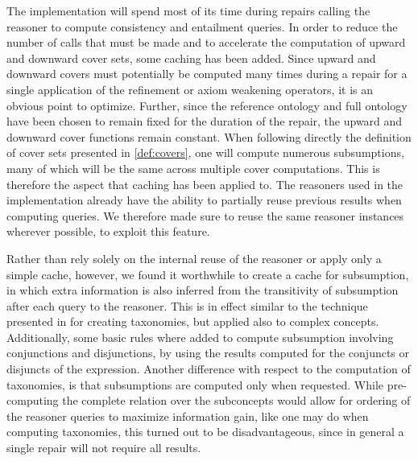 The implementation will spend most of its time during repairs calling the reasoner to compute consistency and entailment queries. In order to reduce the number of calls that must be made and to accelerate the computation of upward and downward cover sets, some caching has been added. Since upward and downward covers must potentially be computed many times during a repair for a single application of the refinement or axiom weakening operators, it is an obvious point to optimize. Further, since the reference ontology and full ontology have been chosen to remain fixed for the duration of the repair, the upward and downward cover functions remain constant. When following directly the definition of cover sets presented in \cref{def:covers}, one will compute numerous subsumptions, many of which will be the same across multiple cover computations. This is therefore the aspect that caching has been applied to. The reasoners used in the implementation already have the ability to partially reuse previous results when computing queries. We therefore made sure to reuse the same reasoner instances wherever possible, to exploit this feature.

Rather than rely solely on the internal reuse of the reasoner or apply only a simple cache, however, we found it worthwhile to create a cache for subsumption, in which extra information is also inferred from the transitivity of subsumption after each query to the reasoner. This is in effect similar to the technique presented in \cite{shearer2009exploiting} for creating taxonomies, but applied also to complex concepts. Additionally, some basic rules where added to compute subsumption involving conjunctions and disjunctions, by using the results computed for the conjuncts or disjuncts of the expression. Another difference with respect to the computation of taxonomies, is that subsumptions are computed only when requested. While pre-computing the complete relation over the subconcepts would allow for ordering of the reasoner queries to maximize information gain, like one may do when computing taxonomies, this turned out to be disadvantageous, since in general a single repair will not require all results. 

